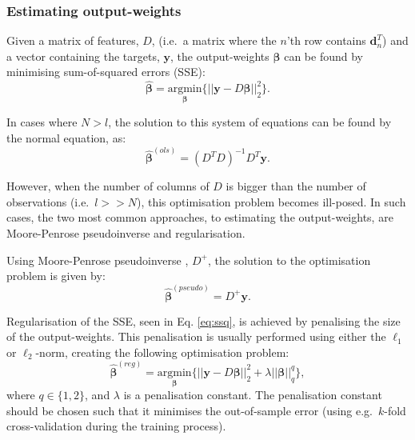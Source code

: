 \documentclass[
]{jss}
\begin{document}
\hypertarget{EST}{%
\subsubsection{Estimating output-weights}\label{EST}}

Given a matrix of features, \(D\), (i.e.~a matrix where the \(n\)'th row
contains \(\boldsymbol d_n^T\)) and a vector containing the targets,
\(\boldsymbol y\), the output-weights \(\boldsymbol \beta\) can be found
by minimising sum-of-squared errors (SSE): \begin{equation}
    \hat{\boldsymbol{\beta}} = \underset{\boldsymbol{\beta}}{\text{argmin}} \Big\{ || \boldsymbol{y} - D\boldsymbol{\beta}||_2^2\Big\}. \label{eq:ssq}
\end{equation}

In cases where \(N > l\), the solution to this system of equations can
be found by the normal equation, as: \begin{equation}
    \hat{\boldsymbol{\beta}}^{(ols)} = (D^T D)^{-1}D^T\boldsymbol{y}. \label{eq:ols}
\end{equation}

However, when the number of columns of \(D\) is bigger than the number
of observations (i.e.~\(l >> N\)), this optimisation problem becomes
ill-posed. In such cases, the two most common approaches, to estimating
the output-weights, are Moore-Penrose pseudoinverse and regularisation.

Using Moore-Penrose pseudoinverse
\citep[\citet{PenroseInv}]{BjerhammarInv}, \(D^+\), the solution to the
optimisation problem is given by: \begin{equation}
    \hat{\boldsymbol \beta}^{(pseudo)} = D^+ \boldsymbol y.
\end{equation}

Regularisation of the SSE, seen in Eq. \eqref{eq:ssq}, is achieved by
penalising the size of the output-weights. This penalisation is usually
performed using either the \(\ell_1\) or \(\ell_2\)-norm, creating the
following optimisation problem: \begin{equation}
    \hat{\boldsymbol{\beta}}^{(reg)} = \underset{\boldsymbol{\beta}}{\text{argmin}} \Big\{ || \boldsymbol{y} - D\boldsymbol{\beta}||_2^2  + \lambda||\boldsymbol{\beta}||_q^q \Big\}, \label{eq:rsse}
\end{equation} where \(q \in \{1, 2\}\), and \(\lambda\) is a
penalisation constant. The penalisation constant should be chosen such
that it minimises the out-of-sample error (using e.g.~\(k\)-fold
cross-validation during the training process).
\end{document}
